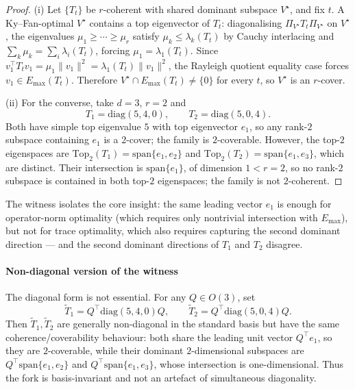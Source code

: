 \documentclass[final,3p,times]{elsarticle}
\newcommand{\Emax}{E_{\max}}
\begin{document}
\begin{proof}
(i) Let $\{T_t\}$ be $r$-coherent with shared dominant subspace
$V^\star$, and fix $t$.
A Ky--Fan-optimal $V^\star$ contains a top eigenvector of $T_t$:
diagonalising $\Pi_{V^\star}T_t\Pi_{V^\star}$ on $V^\star$, the eigenvalues
$\mu_1\ge\cdots\ge\mu_r$ satisfy $\mu_k\le\lambda_k(T_t)$ by Cauchy
interlacing \cite{HornJohnson2013} and $\sum_k\mu_k=\sum_i\lambda_i(T_t)$,
forcing $\mu_1=\lambda_1(T_t)$.
Since $v_1^\top T_t v_1=\mu_1\|v_1\|^2=\lambda_1(T_t)\|v_1\|^2$, the
Rayleigh quotient equality case forces $v_1\in\Emax(T_t)$.
Therefore $V^\star\cap\Emax(T_t)\ne\{0\}$ for every $t$, so $V^\star$ is
an $r$-cover.

(ii) For the converse, take $d=3$, $r=2$ and
\begin{equation}\label{eq:forkwitness}
T_1=\mathrm{diag}(5,4,0),\qquad
T_2=\mathrm{diag}(5,0,4).
\end{equation}
Both have simple top eigenvalue $5$ with top eigenvector $e_1$, so any
rank-$2$ subspace containing $e_1$ is a $2$-cover; the family is
$2$-coverable.
However, the top-$2$ eigenspaces are
$\mathrm{Top}_2(T_1)=\mathrm{span}\{e_1,e_2\}$ and
$\mathrm{Top}_2(T_2)=\mathrm{span}\{e_1,e_3\}$, which are distinct.
Their intersection is $\mathrm{span}\{e_1\}$, of dimension $1<r=2$, so no
rank-$2$ subspace is contained in both top-$2$ eigenspaces; the family
is not $2$-coherent.
\end{proof}

\noindent
The witness isolates the core insight: the same leading vector $e_1$ is
enough for operator-norm optimality (which requires only nontrivial
intersection with $\Emax$), but not for trace optimality, which also
requires capturing the second dominant direction --- and the second
dominant directions of $T_1$ and $T_2$ disagree.

\paragraph{Non-diagonal version of the witness}
The diagonal form is not essential.
For any $Q\in O(3)$, set
\[
\widetilde T_1=Q^\top\mathrm{diag}(5,4,0)Q,
\qquad
\widetilde T_2=Q^\top\mathrm{diag}(5,0,4)Q.
\]
Then $\widetilde T_1,\widetilde T_2$ are generally non-diagonal in the
standard basis but have the same coherence/coverability behaviour:
both share the leading unit vector $Q^\top e_1$, so they are
$2$-coverable, while their dominant $2$-dimensional subspaces are
$Q^\top\mathrm{span}\{e_1,e_2\}$ and $Q^\top\mathrm{span}\{e_1,e_3\}$,
whose intersection is one-dimensional.
Thus the fork is basis-invariant and not an artefact of simultaneous
diagonality.
\end{document}

